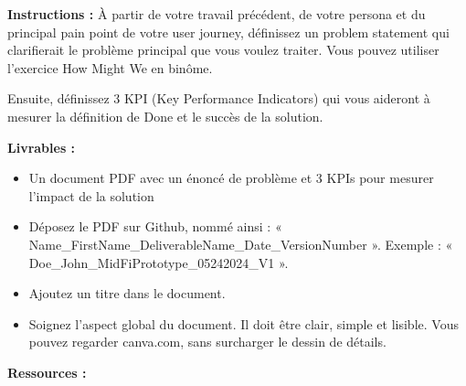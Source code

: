 \makeheaderfiles

\textbf{Instructions :}
À partir de votre travail précédent, de votre persona et du principal pain point de votre user journey, définissez un problem statement qui clarifierait le problème principal que vous voulez traiter.
Vous pouvez utiliser l'exercice How Might We en binôme.

Ensuite, définissez 3 KPI (Key Performance Indicators) qui vous aideront à mesurer la définition de Done et le succès de la solution.

\textbf{Livrables :}

\begin{itemize}
\item Un document PDF avec un énoncé de problème et 3 KPIs pour mesurer l'impact de la solution
\item Déposez le PDF sur Github, nommé ainsi : « Name\_FirstName\_DeliverableName\_Date\_VersionNumber ». Exemple : « Doe\_John\_MidFiPrototype\_05242024\_V1 ».
\item Ajoutez un titre dans le document.
\item Soignez l'aspect global du document. Il doit être clair, simple et lisible. Vous pouvez regarder canva.com, sans surcharger le dessin de détails.
\end{itemize}

\textbf{Ressources :}


